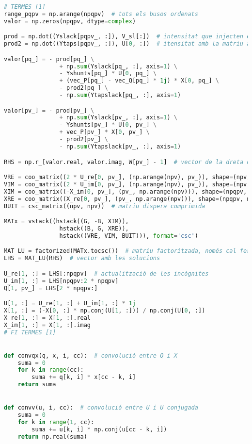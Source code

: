 \begin{lstlisting}[language=Python,numbers=none]
# TERMES [1]
range_pqpv = np.arange(npqpv)  # tots els busos ordenats
valor = np.zeros(npqpv, dtype=complex)

prod = np.dot((Yslack[pqpv_, :]), V_sl[:])  # intensitat que injecten els oscil·lants
prod2 = np.dot((Ytaps[pqpv_, :]), U[0, :])  # itensitat amb la matriu asimètrica

valor[pq_] = - prod[pq_] \
                + np.sum(Yslack[pq_, :], axis=1) \
                - Yshunts[pq_] * U[0, pq_] \
                + (vec_P[pq_] - vec_Q[pq_] * 1j) * X[0, pq_] \
                - prod2[pq_] \
                - np.sum(Ytapslack[pq_, :], axis=1)

valor[pv_] = - prod[pv_] \
                + np.sum(Yslack[pv_, :], axis=1) \
                - Yshunts[pv_] * U[0, pv_] \
                + vec_P[pv_] * X[0, pv_] \
                - prod2[pv_] \
                - np.sum(Ytapslack[pv_, :], axis=1)

RHS = np.r_[valor.real, valor.imag, W[pv_] - 1]  # vector de la dreta del sistema d'equacions

VRE = coo_matrix((2 * U_re[0, pv_], (np.arange(npv), pv_)), shape=(npv, npqpv)).tocsc()  # matriu dispersa COO a compr.
VIM = coo_matrix((2 * U_im[0, pv_], (np.arange(npv), pv_)), shape=(npv, npqpv)).tocsc()
XIM = coo_matrix((-X_im[0, pv_], (pv_, np.arange(npv))), shape=(npqpv, npv)).tocsc()
XRE = coo_matrix((X_re[0, pv_], (pv_, np.arange(npv))), shape=(npqpv, npv)).tocsc()
BUIT = csc_matrix((npv, npv))  # matriu dispera comprimida

MATx = vstack((hstack((G, -B, XIM)),
                hstack((B, G, XRE)),
                hstack((VRE, VIM, BUIT))), format='csc')

MAT_LU = factorized(MATx.tocsc())  # matriu factoritzada, només cal fer-ho una vegada
LHS = MAT_LU(RHS)  # vector amb les solucions

U_re[1, :] = LHS[:npqpv]  # actualització de les incògnites
U_im[1, :] = LHS[npqpv:2 * npqpv]
Q[1, pv_] = LHS[2 * npqpv:]

U[1, :] = U_re[1, :] + U_im[1, :] * 1j
X[1, :] = (-X[0, :] * np.conj(U[1, :])) / np.conj(U[0, :])
X_re[1, :] = X[1, :].real
X_im[1, :] = X[1, :].imag
# FI TERMES [1]


def convqx(q, x, i, cc):  # convolució entre Q i X
    suma = 0
    for k in range(cc):
        suma += q[k, i] * x[cc - k, i]
    return suma


def convv(u, i, cc):  # convolució entre U i U conjugada
    suma = 0
    for k in range(1, cc):
        suma += u[k, i] * np.conj(u[cc - k, i])
    return np.real(suma)



\end{lstlisting}
